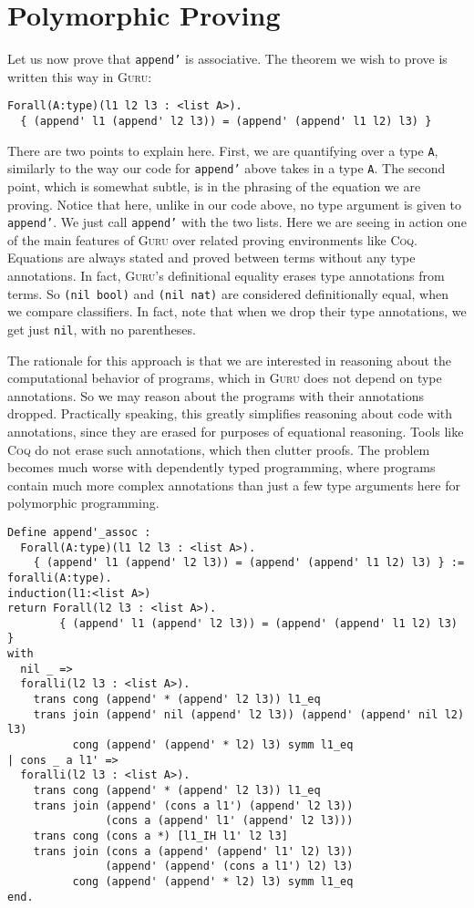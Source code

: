 \documentclass{book}[12pt]
\newcommand{\guru}[0]{\textsc{Guru}\xspace}
\begin{document}
\section{Polymorphic Proving}

Let us now prove that \texttt{append'} is associative.  The theorem we wish to prove
is written this way in \guru:

\begin{verbatim}
Forall(A:type)(l1 l2 l3 : <list A>). 
  { (append' l1 (append' l2 l3)) = (append' (append' l1 l2) l3) }
\end{verbatim}

\noindent There are two points to explain here.  First, we are
quantifying over a type \texttt{A}, similarly to the way our code for
\texttt{append'} above takes in a type \texttt{A}.  The second point,
which is somewhat subtle, is in the phrasing of the equation we are
proving.  Notice that here, unlike in our code above, no type argument
is given to \texttt{append'}.  We just call \texttt{append'} with the
two lists.  Here we are seeing in action one of the main features of
\guru over related proving environments like \textsc{Coq}.  Equations
are always stated and proved between terms without any type
annotations.  In fact, \guru's definitional equality erases type
annotations from terms.  So \texttt{(nil bool)} and \texttt{(nil nat)}
are considered definitionally equal, when we compare classifiers.  In
fact, note that when we drop their type annotations, we get just
\texttt{nil}, with no parentheses.

The rationale for this approach is that we are interested in reasoning
about the computational behavior of programs, which in \guru does not
depend on type annotations.  So we may reason about the programs with
their annotations dropped.  Practically speaking, this greatly
simplifies reasoning about code with annotations, since they are
erased for purposes of equational reasoning.  Tools like \textsc{Coq}
do not erase such annotations, which then clutter proofs.  The problem
becomes much worse with dependently typed programming, where programs
contain much more complex annotations than just a few type arguments
here for polymorphic programming.

\begin{verbatim}
Define append'_assoc : 
  Forall(A:type)(l1 l2 l3 : <list A>). 
    { (append' l1 (append' l2 l3)) = (append' (append' l1 l2) l3) } :=
foralli(A:type).
induction(l1:<list A>) 
return Forall(l2 l3 : <list A>).
        { (append' l1 (append' l2 l3)) = (append' (append' l1 l2) l3) } 
with
  nil _ => 
  foralli(l2 l3 : <list A>). 
    trans cong (append' * (append' l2 l3)) l1_eq
    trans join (append' nil (append' l2 l3)) (append' (append' nil l2) l3)
          cong (append' (append' * l2) l3) symm l1_eq
| cons _ a l1' =>
  foralli(l2 l3 : <list A>).
    trans cong (append' * (append' l2 l3)) l1_eq
    trans join (append' (cons a l1') (append' l2 l3))
               (cons a (append' l1' (append' l2 l3)))
    trans cong (cons a *) [l1_IH l1' l2 l3]
    trans join (cons a (append' (append' l1' l2) l3))
               (append' (append' (cons a l1') l2) l3)
          cong (append' (append' * l2) l3) symm l1_eq
end.
\end{verbatim}
\end{document}
